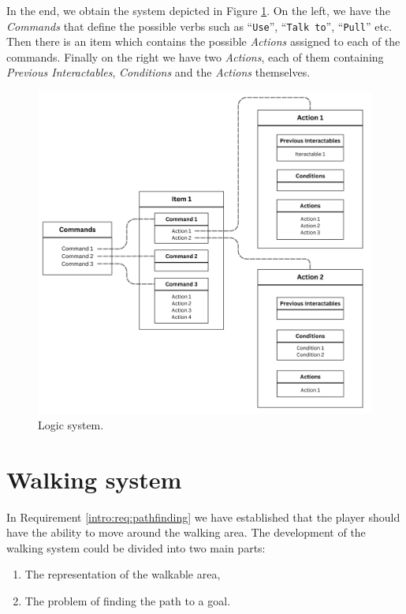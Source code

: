 In the end, we obtain the system depicted in Figure \ref{fig:Logic:Diagram}. On the left, we have the \textit{Commands} that define the possible verbs such as “\texttt{Use}”, “\texttt{Talk to}”, “\texttt{Pull}” etc. Then there is an item which contains the possible \textit{Actions} assigned to each of the commands. Finally on the right we have two \textit{Actions}, each of them containing \textit{Previous Interactables}, \textit{Conditions} and the \textit{Actions} themselves. 

\begin{figure}[H]
\centering
\includegraphics[width=1\linewidth]{img/Action-diagram.png}
\caption{Logic system.}
\label{fig:Logic:Diagram}
\end{figure}


\section{Walking system}
In Requirement \ref{intro:req:pathfinding}  we have established that the player should have the ability to move around the walking area. The development of the walking system could be divided into two main parts:
\begin{enumerate}
    \item The representation of the walkable area,
    \item The problem of finding the path to a goal.
\end{enumerate} 

